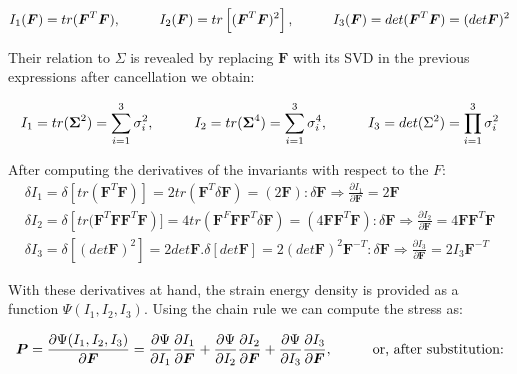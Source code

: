 \begin{gather*}
I_1(\boldsymbol{F})=tr(\boldsymbol{F}^T\boldsymbol{F}), \hspace{10mm}I_2(\boldsymbol{F})=tr\left[(\boldsymbol{F}^T\boldsymbol{F})^2\right], 
\hspace{10mm}I_3(\boldsymbol{F})=det(\boldsymbol{F}^T\boldsymbol{F})=(det\boldsymbol{F})^2
\end{gather*}

Their relation to $\Sigma$ is revealed by replacing $\boldsymbol{F}$ with its SVD in the previous expressions after cancellation we obtain:

\begin{gather*}
I_1 = tr(\boldsymbol{\Sigma}^2)=\sum_{i=1}^3\sigma_i^2, \hspace{10mm}I_2=tr(\boldsymbol{\Sigma}^4)=\sum_{i=1}^3\sigma_i^4, 
\hspace{10mm}I_3=det(\Sigma^2)=\prod_{i=1}^3\sigma_i^2
\end{gather*}

After computing the derivatives of the invariants with respect to the $F$:
\begin{gather*}
 \delta I_1= \delta\left[tr(\boldsymbol{F}^T\boldsymbol{F})\right]=2tr(\boldsymbol{F}^T\delta\boldsymbol{F})=(2\boldsymbol{F}):\delta\boldsymbol{F}\Rightarrow
 \frac{\partial I_1}{\partial\boldsymbol{F}}=2\boldsymbol{F}\\
 \delta I_2 = \delta \left[ tr(\boldsymbol{F}^T\boldsymbol{F}\boldsymbol{F}^T\boldsymbol{F}\right)]=4tr(\boldsymbol{F}^F\boldsymbol{F}\boldsymbol{F}^T\delta\boldsymbol{F})=
 (4\boldsymbol{F}\boldsymbol{F}^T\boldsymbol{F}):\delta\boldsymbol{F} \Rightarrow \frac{\partial I_2}{\partial \boldsymbol{F}}=4\boldsymbol{F}\boldsymbol{F}^T\boldsymbol{F} \\
 \delta I_3=\delta \left[(det \boldsymbol{F})^2\right] = 2det\boldsymbol{F}.\delta\left[det \boldsymbol{F} \right] = 2(det \boldsymbol{F})^2\boldsymbol{F}^{-T}:\delta\boldsymbol{F} \Rightarrow
 \frac{\partial I_3}{\partial \boldsymbol{F}}=2I_3\boldsymbol{F}^{-T}
\end{gather*}

With these derivatives at hand, the strain energy density is provided as a function $\Psi(I_1, I_2, I_3)$. Using the chain rule we can compute the stress as:

\begin{align}
 \boldsymbol{P}=\frac{\partial \Psi(I_1, I_2, I_3)}{\partial\boldsymbol{F}}=
 \frac{\partial \Psi}{\partial I_1}\frac{\partial I_1}{\partial \boldsymbol{F}}+
 \frac{\partial \Psi}{\partial I_2}\frac{\partial I_2}{\partial \boldsymbol{F}}+
 \frac{\partial \Psi}{\partial I_3}\frac{\partial I_3}{\partial \boldsymbol{F}},
 \hspace{10mm}\text{or, after substitution:}\nonumber
\end{align}

